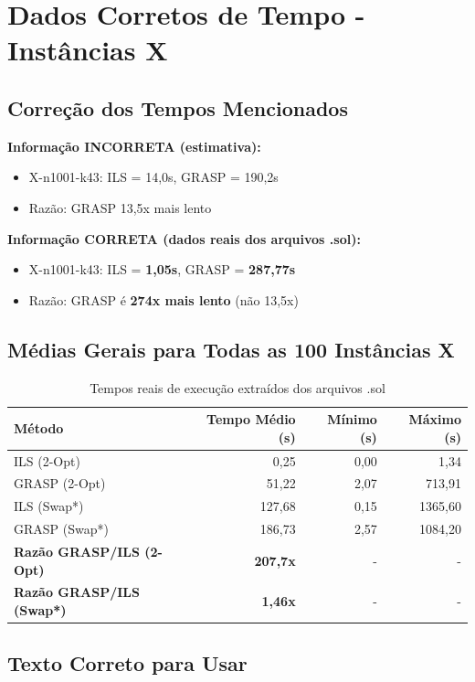 \documentclass[12pt,a4paper]{article}
\begin{document}
\section*{Dados Corretos de Tempo - Instâncias X}

\subsection*{Correção dos Tempos Mencionados}

\textbf{Informação INCORRETA (estimativa):}
\begin{itemize}
    \item X-n1001-k43: ILS = 14,0s, GRASP = 190,2s
    \item Razão: GRASP 13,5x mais lento
\end{itemize}

\textbf{Informação CORRETA (dados reais dos arquivos .sol):}
\begin{itemize}
    \item X-n1001-k43: ILS = \textbf{1,05s}, GRASP = \textbf{287,77s}
    \item Razão: GRASP é \textbf{274x mais lento} (não 13,5x)
\end{itemize}

\subsection*{Médias Gerais para Todas as 100 Instâncias X}

\begin{table}[h]
\centering
\begin{tabular}{lrrr}
\toprule
Método & Tempo Médio (s) & Mínimo (s) & Máximo (s) \\
\midrule
ILS (2-Opt)    & 0,25   & 0,00   & 1,34 \\
GRASP (2-Opt)  & 51,22  & 2,07   & 713,91 \\
ILS (Swap*)    & 127,68 & 0,15   & 1365,60 \\
GRASP (Swap*)  & 186,73 & 2,57   & 1084,20 \\
\midrule
\textbf{Razão GRASP/ILS (2-Opt)} & \textbf{207,7x} & - & - \\
\textbf{Razão GRASP/ILS (Swap*)} & \textbf{1,46x} & - & - \\
\bottomrule
\end{tabular}
\caption{Tempos reais de execução extraídos dos arquivos .sol}
\end{table}

\subsection*{Texto Correto para Usar}
\end{document}
